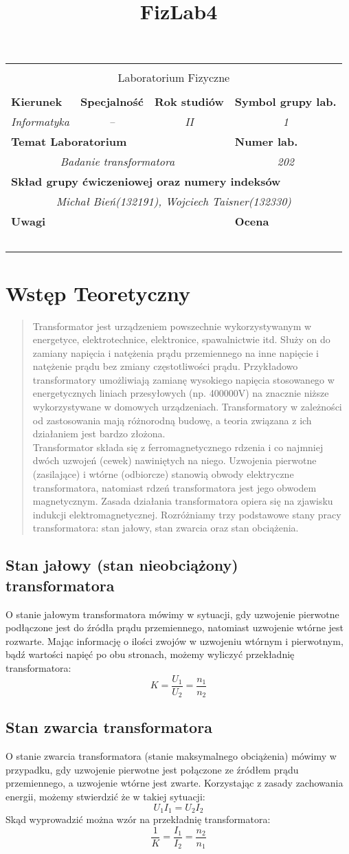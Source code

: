 \documentclass[polish,a4paper]{article}
\title{FizLab4}
\newcommand{\PRzFieldDsc}[1]{\sffamily\bfseries\scriptsize #1}
\newcommand{\PRzFieldCnt}[1]{\textit{#1}}
\newcommand{\PRzHeading}[8]{
\begin{center}
\begin{tabular}{ p{0.32\textwidth} p{0.15\textwidth} p{0.15\textwidth} p{0.12\textwidth} p{0.12\textwidth} }

  &   &   &   &   \\
\hline
\multicolumn{5}{|c|}{}\\[-1ex]
\multicolumn{5}{|c|}{{\LARGE #1}}\\
\multicolumn{5}{|c|}{}\\[-1ex]

\hline
\multicolumn{1}{|l|}{\PRzFieldDsc{Kierunek}}	& \multicolumn{1}{|l|}{\PRzFieldDsc{Specjalność}}	& \multicolumn{1}{|l|}{\PRzFieldDsc{Rok studiów}}	& \multicolumn{2}{|l|}{\PRzFieldDsc{Symbol grupy lab.}} \\
\multicolumn{1}{|c|}{\PRzFieldCnt{#2}}		& \multicolumn{1}{|c|}{\PRzFieldCnt{#3}}		& \multicolumn{1}{|c|}{\PRzFieldCnt{#4}}		& \multicolumn{2}{|c|}{\PRzFieldCnt{#5}} \\

\hline
\multicolumn{4}{|l|}{\PRzFieldDsc{Temat Laboratorium}}		& \multicolumn{1}{|l|}{\PRzFieldDsc{Numer lab.}} \\
\multicolumn{4}{|c|}{\PRzFieldCnt{#6}}				& \multicolumn{1}{|c|}{\PRzFieldCnt{#7}} \\

\hline
\multicolumn{5}{|l|}{\PRzFieldDsc{Skład grupy ćwiczeniowej oraz numery indeksów}}\\
\multicolumn{5}{|c|}{\PRzFieldCnt{#8}}\\

\hline
\multicolumn{3}{|l|}{\PRzFieldDsc{Uwagi}}	& \multicolumn{2}{|l|}{\PRzFieldDsc{Ocena}} \\
\multicolumn{3}{|c|}{\PRzFieldCnt{\ }}		& \multicolumn{2}{|c|}{\PRzFieldCnt{\ }} \\

\hline
\end{tabular}
\end{center}
}
\begin{document}
\PRzHeading{Laboratorium Fizyczne}{Informatyka}{--}{II}{1}{ Badanie transformatora }{202}{Michał Bień(132191), Wojciech Taisner(132330)}{}

\section{Wstęp Teoretyczny}
\begin{quotation}\cite{lapsa}
Transformator jest urządzeniem powszechnie wykorzystywanym w energetyce, elektrotechnice, elektronice, spawalnictwie itd. Służy on do zamiany napięcia i natężenia prądu przemiennego na inne napięcie i natężenie prądu bez zmiany częstotliwości prądu. Przykładowo transformatory umożliwiają zamianę wysokiego napięcia stosowanego w energetycznych liniach przesyłowych (np. 400000V) na znacznie niższe wykorzystywane w domowych urządzeniach. Transformatory w zależności od zastosowania mają różnorodną budowę, a teoria związana z ich działaniem jest bardzo złożona.\\
Transformator składa się z ferromagnetycznego rdzenia i co najmniej dwóch uzwojeń (cewek)  nawiniętych na niego. Uzwojenia  pierwotne  (zasilające)  i  wtórne  (odbiorcze)  stanowią  obwody elektryczne transformatora, natomiast rdzeń transformatora jest jego obwodem magnetycznym.
Zasada działania transformatora opiera się na zjawisku indukcji elektromagnetycznej. Rozróżniamy trzy podstawowe stany pracy transformatora: stan jałowy, stan zwarcia oraz stan obciążenia.
\end{quotation}
\subsection{Stan jałowy (stan nieobciążony) transformatora}
O stanie jałowym transformatora mówimy w sytuacji, gdy uzwojenie pierwotne podłączone jest do źródła prądu przemiennego, natomiast uzwojenie wtórne jest rozwarte. Mając informację o ilości zwojów w uzwojeniu wtórnym i pierwotnym, bądź wartości napięć po obu stronach, możemy wyliczyć przekładnię transformatora:
$$K=\frac{U_1}{U_2}=\frac{n_1}{n_2}$$
\subsection{Stan zwarcia transformatora}
O stanie zwarcia transformatora (stanie maksymalnego obciążenia) mówimy w przypadku, gdy uzwojenie pierwotne jest połączone ze źródłem prądu przemiennego, a uzwojenie wtórne jest zwarte. Korzystając z zasady zachowania energii, możemy stwierdzić że w takiej sytuacji:
$$U_1I_1 = U_2I_2$$
Skąd wyprowadzić można wzór na przekładnię transformatora:
$$\frac{1}{K}=\frac{I_1}{I_2}=\frac{n_2}{n_1}$$
\end{document}
